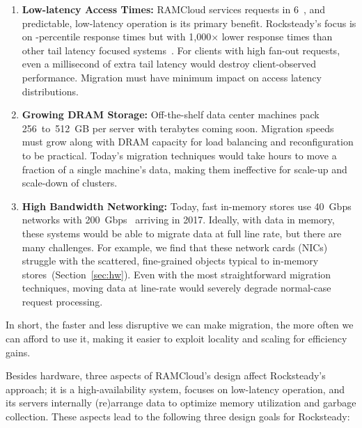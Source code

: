 \begin{enumerate}
\item {\bf Low-latency Access Times:}
RAMCloud services requests in 6~\us, and predictable, low-latency operation is
its primary benefit.  Rocksteady's focus is on \nnnth{}-percentile response
times but with 1,000$\times$ lower response times than other tail latency
focused systems~\cite{dynamo}. For clients with high fan-out requests, even
a millisecond of extra tail latency would destroy client-observed
performance. Migration must have minimum impact on access latency
distributions.

\item {\bf Growing DRAM Storage:}
Off-the-shelf data center machines pack 256~to~512~GB per server
with terabytes coming soon. Migration speeds must
grow along with DRAM capacity for load balancing and reconfiguration to be
practical. Today's migration techniques would take hours
to move a fraction of a single machine's data, making them ineffective for
scale-up and scale-down of clusters.

\item {\bf High Bandwidth Networking:}
Today, fast in-memory stores use 40~Gbps networks with
200~Gbps~\cite{mellanox-cx6} arriving in 2017. Ideally, with data in memory, these
systems would be able to migrate data at full line rate, but there are many
challenges. For example, we find that these network cards (NICs)
struggle with the scattered, fine-grained objects typical to in-memory
stores~(Section~\ref{sec:hw}).  Even with the most straightforward migration
techniques, moving data at line-rate would severely degrade
normal-case request processing.

\end{enumerate}

In short, the faster and less disruptive we can make migration, the more often we can
afford to use it, making it easier to exploit locality and scaling for efficiency gains.

Besides hardware, three aspects of RAMCloud's design affect Rocksteady's
approach; it is a high-availability system, focuses on low-latency
operation, and its servers internally (re)arrange data to optimize memory
utilization and garbage collection. These aspects lead to the following
three design goals for Rocksteady:

